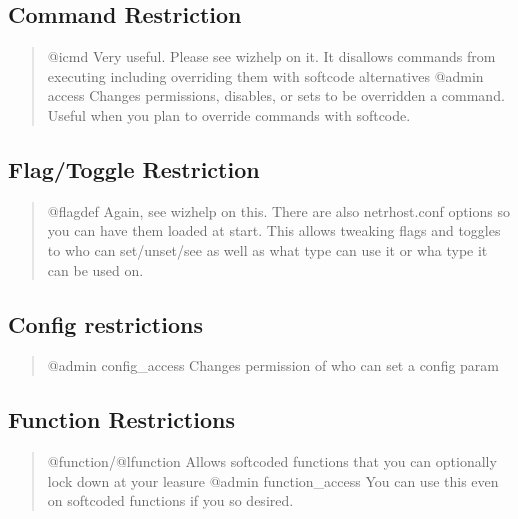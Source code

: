 \documentclass[letterpaper,10pt,english]{sphinxmanual}
\begin{document}
\subsection{Command Restriction}
\label{\detokenize{security:command-restriction}}\begin{quote}

\sphinxAtStartPar
@icmd    \sphinxhyphen{} Very useful.   Please see wizhelp on it.  It disallows commands from executing including overriding them with softcode alternatives
@admin access \sphinxhyphen{} Changes permissions, disables, or sets to be overridden a command.  Useful when you plan to override commands with softcode.
\end{quote}


\subsection{Flag/Toggle Restriction}
\label{\detokenize{security:flag-toggle-restriction}}\begin{quote}

\sphinxAtStartPar
@flagdef \sphinxhyphen{} Again, see wizhelp on this.  There are also netrhost.conf options so you can have them loaded at start.  This allows tweaking flags and toggles to who can set/unset/see as well as what type can use it or wha type it can be used on.
\end{quote}


\subsection{Config restrictions}
\label{\detokenize{security:config-restrictions}}\begin{quote}

\sphinxAtStartPar
@admin config\_access \sphinxhyphen{} Changes permission of who can set a config param
\end{quote}


\subsection{Function Restrictions}
\label{\detokenize{security:function-restrictions}}\begin{quote}

\sphinxAtStartPar
@function/@lfunction \sphinxhyphen{}\sphinxhyphen{} Allows softcoded functions that you can optionally lock down at your leasure
@admin function\_access \sphinxhyphen{}\sphinxhyphen{} You can use this even on softcoded functions if you so desired.
\end{quote}
\end{document}
